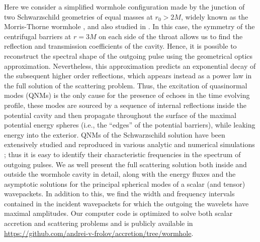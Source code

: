 \documentclass[article,aps,nofootinbib,twocolumn,superscriptaddress]{revtex4-1}
\begin{document}
Here we consider a simplified wormhole configuration made by the junction of two Schwarzschild geometries of equal masses at $r_0>2M$, widely known as the Morris-Thorne wormhole \citep{doi:10.1119/1.15620}, and also studied in \citep{Cardoso:2016oxy}. In this case, the symmetry of the centrifugal barriers at $r=3M$ on each side of the throat allows us to find the reflection and transmission coefficients of the cavity. Hence, it is possible to reconstruct the spectral shape of the outgoing pulse using the geometrical optics approximation. Nevertheless, this approximation predicts an exponential decay of the subsequent higher order reflections, which appears instead as a power law in the full solution of the scattering problem. Thus, the excitation of quasinormal modes (QNMs) is the only cause for the presence of echoes in the time evolving profile, these modes are sourced by a sequence of internal reflections inside the potential cavity and then propagate throughout the surface of the maximal potential energy spheres (i.e., the ``edges'' of the potential barriers), while leaking energy into the exterior. QNMs of the Schwarzschild solution have been extensively studied and reproduced in various analytic and numerical simulations \citep{Chandrasekhar:1975zza, PhysRevD.46.4179}; thus it is easy to identify their characteristic frequencies in the spectrum of outgoing pulses. We as well present the full scattering solution both inside and outside the wormhole cavity in detail, along with the energy fluxes and the asymptotic solutions for the principal spherical modes of a scalar (and tensor) wavepackets. In addition to this, we find the width and frequency intervals contained in the incident wavepackets for which the outgoing the wavelets have maximal amplitudes. Our computer code is optimized to solve both scalar accretion and scattering problems and is publicly available in \url{https://github.com/andrei-v-frolov/accretion/tree/wormhole}.
\end{document}
